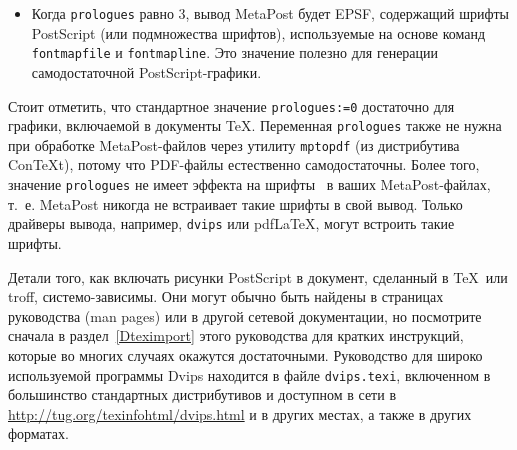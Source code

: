 \documentclass{article} %
\def\ttindex#1{{\tt #1}\index{#1?\texttt{#1}}}
\def\ttt{\texttt}  %
\def\ConTeXt{Con\TeX t}
\begin{document}
\begin{itemize}
\item Когда \ttt{prologues} равно 3, вывод MetaPost будет EPSF, содержащий 
шрифты PostScript (или подмножества шрифтов),  используемые на основе команд 
\ttt{fontmapfile} и \ttt{fontmapline}. 
Это значение полезно для генерации самодостаточной PostScript-графики.
\end{itemize}

Стоит отметить, что стандартное значение \ttt{prologues:=0} достаточно для 
графики, включаемой в документы \TeX.
Переменная \ttt{prologues} также не нужна при обработке MetaPost-файлов 
через утилиту \ttindex{mptopdf} (из дистрибутива \ConTeXt), потому что 
PDF-файлы естественно самодостаточны.  
Более того, значение \ttt{prologues} не имеет эффекта на шрифты \MF\ в 
ваших MetaPost-файлах, т.~е. MetaPost никогда не встраивает такие шрифты 
в свой вывод.
Только драйверы вывода, например, \ttt{dvips} или pdf\LaTeX, могут встроить 
такие шрифты.

Детали того, как включать рисунки PostScript в документ, сделанный в 
\TeX\ или troff, системо-зависимы.
Они могут обычно быть найдены в страницах руководства (man pages) или 
в другой сетевой документации, но посмотрите сначала 
в раздел~\ref{Dteximport} этого руководства для кратких инструкций, 
которые во многих случаях окажутся достаточными.
Руководство для широко используемой программы Dvips находится в файле 
\ttt{dvips.texi}, включенном в большинство стандартных дистрибутивов и 
доступном в сети в \url{http://tug.org/texinfohtml/dvips.html} и в других 
местах, а также в других форматах.
\end{document}
